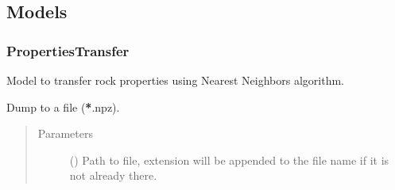 \documentclass[letterpaper,10pt,english]{sphinxmanual}
\begin{document}
\subsection{Models}
\label{\detokenize{api/models:models}}\label{\detokenize{api/models::doc}}

\subsubsection{PropertiesTransfer}
\label{\detokenize{api/properties_transfer:propertiestransfer}}\label{\detokenize{api/properties_transfer::doc}}

\begin{fulllineitems}
\label{\detokenize{api/properties_transfer:geology.models.PropertiesTransfer}}
Model to transfer rock properties using Nearest Neighbors algorithm.

\begin{fulllineitems}
\label{\detokenize{api/properties_transfer:geology.models.PropertiesTransfer.dump}}
Dump to a file ({\color{red}\bfseries{}*}.npz).
\begin{quote}\begin{description}
\item[{Parameters}] \leavevmode
{} () \textendash{} Path to file,  extension will be appended to the file name if it is not
already there.

\end{description}\end{quote}

\end{fulllineitems}



\end{fulllineitems}
\end{document}
